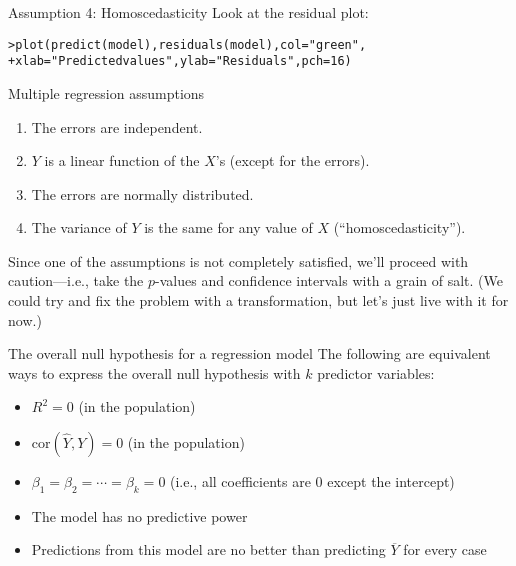 \documentclass{beamer}\usepackage[]{graphicx}\usepackage[]{color}
\makeatletter
\newcommand{\hlnum}[1]{\textcolor[rgb]{0.824,0.412,0.118}{#1}}%
\newcommand{\hlstr}[1]{\textcolor[rgb]{1,0.894,0.71}{#1}}%
\newcommand{\hlstd}[1]{\textcolor[rgb]{1,0.894,0.769}{#1}}%
\newcommand{\hlkwc}[1]{\textcolor[rgb]{0.78,0.941,0.545}{#1}}%
\newcommand{\hlkwd}[1]{\textcolor[rgb]{1,0.78,0.769}{#1}}%
\newenvironment{kframe}{%
 \def\at@end@of@kframe{}%
 \ifinner\ifhmode%
  \def\at@end@of@kframe{\end{minipage}}%
  \begin{minipage}{\columnwidth}%
 \fi\fi%
 \def\FrameCommand##1{\hskip\@totalleftmargin \hskip-\fboxsep
 \colorbox{shadecolor}{##1}\hskip-\fboxsep
     \hskip-\linewidth \hskip-\@totalleftmargin \hskip\columnwidth}%
 \MakeFramed {\advance\hsize-\width
   \@totalleftmargin\z@ \linewidth\hsize
   \@setminipage}}%
 {\par\unskip\endMakeFramed%
 \at@end@of@kframe}
\newenvironment{knitrout}{}{} %
\makeatother
\begin{document}
\begin{darkframes}
    \begin{frame}[fragile]{Assumption 4: Homoscedasticity}
      Look at the residual plot:
      \fontsm
\begin{knitrout}
\begin{kframe}
\begin{alltt}
\hlstd{> }\hlkwd{plot}\hlstd{(}\hlkwd{predict}\hlstd{(model),} \hlkwd{residuals}\hlstd{(model),} \hlkwc{col}\hlstd{=}\hlstr{"green"}\hlstd{,}
\hlstd{+ }  \hlkwc{xlab}\hlstd{=}\hlstr{"Predicted values"}\hlstd{,} \hlkwc{ylab}\hlstd{=}\hlstr{"Residuals"}\hlstd{,} \hlkwc{pch}\hlstd{=}\hlnum{16}\hlstd{)}
\end{alltt}
\end{kframe}


\end{knitrout}
    \end{frame}

    \begin{frame}{Multiple regression assumptions}
      \begin{enumerate}
        \item The errors are independent. \greencheckmark
        \item $Y$ is a linear function of the $X$'s (except for the errors). \greencheckmark
        \item The errors are normally distributed. \greencheckmark
        \item The variance of $Y$ is the same for any value of $X$ (``homoscedasticity''). \shrug[red]
      \end{enumerate}
    \end{frame}

    \begin{frame}
      \begin{center}
        Since one of the assumptions is not completely satisfied, we'll proceed with caution---i.e., take the $p$-values and confidence intervals with a grain of salt.  (We could try and fix the problem with a transformation, but let's just live with it for now.)
      \end{center}
    \end{frame}

    \begin{frame}{The overall null hypothesis for a regression model}
      The following are equivalent ways to express the overall null hypothesis with $k$ predictor variables:
      \begin{itemize}[<+->]
        \item $R^2=0$ (in the population)
        \item $\text{cor}(\hat Y,Y)=0$ (in the population)
        \item $\beta_1=\beta_2=\cdots=\beta_k=0$ (i.e., all coefficients are 0 except the intercept)
        \item The model has no predictive power
        \item Predictions from this model are no better than predicting $\overline Y$ for every case
      \end{itemize}
    \end{frame}


\end{darkframes}
\end{document}
